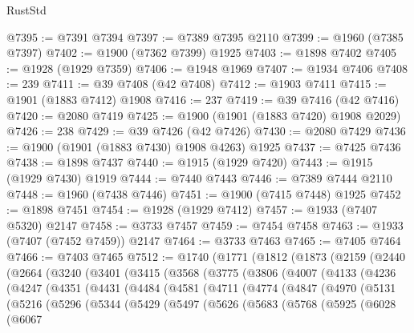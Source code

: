 \begin{lexlean}{RustStd}
\begin{coremodule}
{\begin{coremodule}
{{{{{{{{{{{{{{{{{{{{{{{{{{{{{{{{{{{{{{{{{{{@7395 := @7391 @7394
@7397 := @7389 @7395 @2110
@7399 := @1960 (@7385 @7397)
@7402 := @1900 (@7362 @7399) @1925
@7403 := @1898 @7402
@7405 := @1928 (@1929 @7359)
@7406 := @1948 @1969
@7407 := @1934 @7406
@7408 := 239
@7411 := @39 @7408 (@42 @7408)
@7412 := @1903 @7411
@7415 := @1901 (@1883 @7412) @1908
@7416 := 237
@7419 := @39 @7416 (@42 @7416)
@7420 := @2080 @7419
@7425 := @1900 (@1901 (@1883 @7420) @1908 @2029)
@7426 := 238
@7429 := @39 @7426 (@42 @7426)
@7430 := @2080 @7429
@7436 := @1900 (@1901 (@1883 @7430) @1908 @4263) @1925
@7437 := @7425 @7436
@7438 := @1898 @7437
@7440 := @1915 (@1929 @7420)
@7443 := @1915 (@1929 @7430) @1919
@7444 := @7440 @7443
@7446 := @7389 @7444 @2110
@7448 := @1960 (@7438 @7446)
@7451 := @1900 (@7415 @7448) @1925
@7452 := @1898 @7451
@7454 := @1928 (@1929 @7412)
@7457 := @1933 (@7407 @5320) @2147
@7458 := @3733 @7457
@7459 := @7454 @7458
@7463 := @1933 (@7407 (@7452 @7459)) @2147
@7464 := @3733 @7463
@7465 := @7405 @7464
@7466 := @7403 @7465
@7512 := @1740
    (@1771
      (@1812
        (@1873
          (@2159
            (@2440
              (@2664
                (@3240
                  (@3401
                    (@3415
                      (@3568
                        (@3775
                          (@3806
                            (@4007
                              (@4133
                                (@4236
                                  (@4247
                                    (@4351
                                      (@4431
                                        (@4484
                                          (@4581
                                            (@4711
                                              (@4774
                                                (@4847
                                                  (@4970
                                                    (@5131
                                                      (@5216
                                                        (@5296
                                                          (@5344
                                                            (@5429
                                                              (@5497
                                                                (@5626
                                                                  (@5683
                                                                    (@5768
                                                                      (@5925
                                                                        (@6028
                                                                          (@6067
}}}}}}}}}}}}}}}}}}}}}}}}}}}}}}}}}}}}}}}}}}}
\end{coremodule}}
\end{coremodule}
\end{lexlean}
